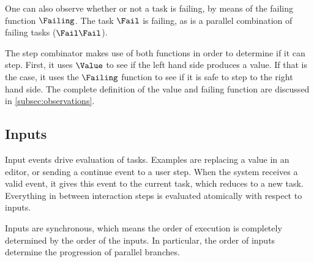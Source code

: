 One can also observe whether or not a task is failing, by means of the failing function $\Failing$.
The task $\Fail$ is failing, as is a parallel combination of failing tasks ($\Fail \And \Fail$).

The step combinator makes use of both functions in order to determine if it can step.
First, it uses $\Value$ to see if the left hand side produces a value.
If that is the case, it uses the $\Failing$ function to see if it is safe to step to the right hand side.
The complete definition of the value and failing function are discussed in \cref{subsec:observations}.



\subsection{Inputs}

Input events drive evaluation of tasks.
Examples are replacing a value in an editor,
or sending a continue event to a user step.
When the system receives a valid event, it gives this event to the current task, which reduces to a new task.
Everything in between interaction steps is evaluated atomically with respect to inputs.

Inputs are synchronous, which means the order of execution is completely determined by the order of the inputs.
In particular, the order of inputs determine the progression of parallel branches.
